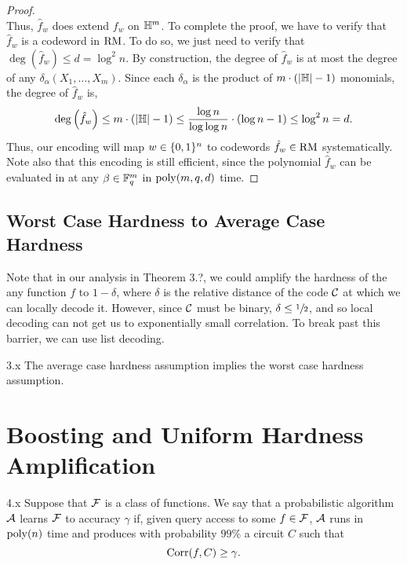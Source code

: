 \documentclass[11pt]{article}
\begin{document}
\begin{proof}
\begin{equation*}
    \end{equation*}
    Thus, $\hat{f}_w$ does extend $f_w$ on $\mathbb{H}^m$. To complete the proof, we have to verify that $\hat{f}_w$ is a codeword in $\mathrm{RM}$. To do so, we just need to verify that $\deg(\hat{f}_w) \leq d = \log^2 n$. By construction, the degree of $\hat{f}_w$ is at most the degree of any $\delta_\alpha(X_1, \ldots, X_m)$. Since each $\delta_\alpha$ is the product of $m \cdot (|\mathbb{H}| - 1)$ monomials, the degree of $\hat{f}_w$ is,
    \begin{equation*}
        \deg \left(\hat{f}_w\right) \leq m \cdot (|\mathbb{H}| - 1) \leq \frac{\log n}{\log \log n} \cdot \left(\log n - 1\right) \leq \log^2 n = d.
    \end{equation*}
    Thus, our encoding will map $w \in \{0, 1\}^n$ to codewords $\hat{f}_w \in \mathrm{RM}$ systematically. Note also that this encoding is still efficient, since the polynomial $\hat{f}_w$ can be evaluated in at any $\beta \in \mathbb{F}_q^m$ in $\mathrm{poly}(m, q, d)$ time.
\end{proof}

\subsection{Worst Case Hardness to Average Case Hardness}

Note that in our analysis in Theorem 3.?, we could amplify the hardness of the any function $f$ to $1 - \delta$, where $\delta$ is the relative distance of the code $\mathcal{C}$ at which we can locally decode it. However, since $\mathcal{C}$ must be binary, $\delta \leq \sfrac{1}{2}$, and so local decoding can not get us to exponentially small correlation. To break past this barrier, we can use list decoding. 

\begin{theorem}{3.x}
    The average case hardness assumption implies the worst case hardness assumption.
\end{theorem}



\section{Boosting and Uniform Hardness Amplification}


\begin{definition}{4.x}
    Suppose that $\mathcal{F}$ is a class of functions. We say that a probabilistic algorithm $\mathcal{A}$ learns $\mathcal{F}$ to accuracy $\gamma$ if, given query access to some $f \in \mathcal{F}$, $\mathcal{A}$ runs in $\mathrm{poly}(n)$ time and produces with probability $99\%$ a circuit $C$ such that 
    \begin{equation*}
        \mathrm{Corr}(f, C) \geq \gamma.
    \end{equation*}
\end{definition}
\end{document}
